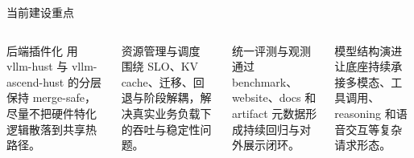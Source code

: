 \documentclass[aspectratio=169,11pt,fontset=none]{ctexbeamer}
\begin{document}
\begin{frame}{当前建设重点}
  \small
  \begin{columns}[T]
    \begin{block}{后端插件化}
      用 vllm-hust 与 vllm-ascend-hust 的分层保持 merge-safe，尽量不把硬件特化逻辑散落到共享热路径。
    \end{block}

    \begin{block}{资源管理与调度}
      围绕 SLO、KV cache、迁移、回退与阶段解耦，解决真实业务负载下的吞吐与稳定性问题。
    \end{block}

    \begin{block}{统一评测与观测}
      通过 benchmark、website、docs 和 artifact 元数据形成持续回归与对外展示闭环。
    \end{block}

    \begin{block}{模型结构演进}
      让底座持续承接多模态、工具调用、reasoning 和语音交互等复杂请求形态。
    \end{block}
  \end{columns}

\end{frame}
\end{document}
